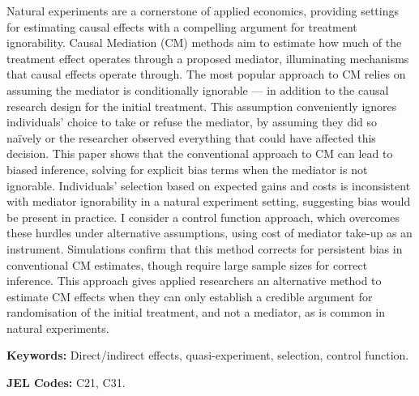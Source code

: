 \noindent
Natural experiments are a cornerstone of applied economics, providing settings for estimating causal effects with a compelling argument for treatment ignorability.
Causal Mediation (CM) methods aim to estimate how much of the treatment effect operates through a proposed mediator, illuminating mechanisms that causal effects operate through.
The most popular approach to CM relies on assuming the mediator is conditionally ignorable --- in addition to the causal research design for the initial treatment.
This assumption conveniently ignores individuals' choice to take or refuse the mediator, by assuming they did so na\"ively or the researcher observed everything that could have affected this decision.
This paper shows that the conventional approach to CM can lead to biased inference, solving for explicit bias terms when the mediator is not ignorable.
Individuals' selection based on expected gains and costs is inconsistent with mediator ignorability in a natural experiment setting, suggesting bias would be present in practice.
I consider a control function approach, which overcomes these hurdles under alternative assumptions, using cost of mediator take-up as an instrument.
Simulations confirm that this method corrects for persistent bias in conventional CM estimates, though require large sample sizes for correct inference.
This approach gives applied researchers an alternative method to estimate CM effects when they can only establish a credible argument for randomisation of the initial treatment, and not a mediator, as is common in natural experiments.

\vspace{0.5cm}
\noindent
\textbf{Keywords:}
Direct/indirect effects, quasi-experiment, selection, control function.

\vspace{0.1cm}
\noindent
\textbf{JEL Codes:}
C21, C31.
